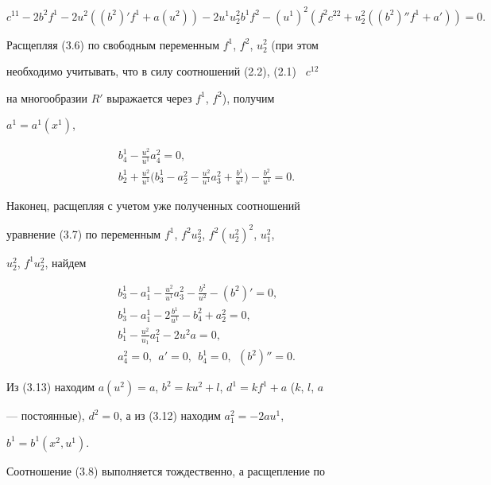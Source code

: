 \begin{equation} 


c^{11}-2b^2f^1-2u^2((b^2)' f^1+a(u^2))-2u^1u^2_2b^1f^2- 


(u^1)^2(f^2c^{22}+u^2_2((b^2)'' f^1+a'))=0. 


\end{equation} 


Расщепляя (3.6) по свободным переменным $f^1$, $f^2$, $u^2_2$ (при этом 


необходимо учитывать, что в силу соотношений (2.2), (2.1) \ $c^{12}$ 


на многообразии $R'$ выражается через $f^1$, $f^2$), получим 


$a^1=a^1(x^1)$, 


\begin{gather} 


b^1_4-\frac{u^2}{u^1}a^2_4=0,\\ 


b^1_2+\frac{u^2}{u^1}\bigg(b^1_3-a^2_2-\frac{u^2}{u^1} 


a^2_3+\frac{b^1}{u^1}\bigg)-\frac{b^2}{u^1}=0. 


\end{gather} 


Наконец, расщепляя с учетом уже полученных соотношений 


уравнение (3.7) по переменным $f^1$, $f^2u^2_2$, $f^2(u^2_2)^2$, $u^2_1$, 


$u^2_2$, $f^1u^2_2$, найдем 


\begin{gather} 


b^1_3-a^1_1-\frac{u^2}{u^1}a^2_3-\frac{b^2}{u^2}-(b^2)'=0,\\ 


b^1_3-a^1_1-2\frac{b^1}{u^1}-b^2_4+a^2_2=0,\\ 


b^1_1-\frac{u^2}{u_1}a^2_1-2u^2a=0,\\ 


a^2_4=0,\ \ a'=0,\ \ b^1_4=0,\ \ (b^2)''=0. 


\end{gather} 


Из (3.13) находим $a(u^2)=a$, $b^2=ku^2+l$, $d^1=kf^1+a$ ($k$, $l$, $a$ 


--- постоянные), $d^2=0$, а из (3.12) находим $a^2_1=-2au^1$, 


$b^1=b^1(x^2,u^1)$. 


Соотношение (3.8) выполняется тождественно, а расщепление по 



